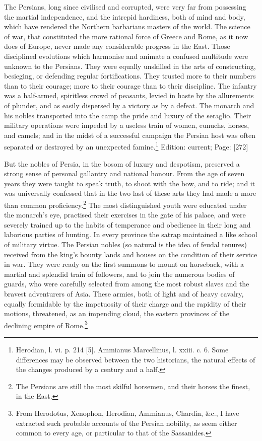 The Persians, long since civilised and corrupted, were very far from possessing the martial independence, and the intrepid hardiness, both of mind and body, which have rendered the Northern barbarians masters of the world. The science of war, that constituted the more rational force of Greece and Rome, as it now does of Europe, never made any considerable progress in the East. Those disciplined evolutions which harmonise and animate a confused multitude were unknown to the Persians. They were equally unskilled in the arts of constructing, besieging, or defending regular fortifications. They trusted more to their numbers than to their courage; more to their courage than to their discipline. The infantry was a half-armed, spiritless crowd of peasants, levied in haste by the allurements of plunder, and as easily dispersed by a victory as by a defeat. The monarch and his nobles transported into the camp the pride and luxury of the seraglio. Their military operations were impeded by a useless train of women, eunuchs, horses, and camels; and in the midst of a successful campaign the Persian host was often separated or destroyed by an unexpected famine.\footnote{Herodian, l. vi. p. 214 [5]. Ammianus Marcellinus, l. xxiii. c. 6. Some differences may be observed between the two historians, the natural effects of the changes produced by a century and a half.}
Edition: current; Page: [272]

But the nobles of Persia, in the bosom of luxury and despotism, preserved a strong sense of personal gallantry and national honour. From the age of seven years they were taught to speak truth, to shoot with the bow, and to ride; and it was universally confessed that in the two last of these arts they had made a more than common proficiency.\footnote{The Persians are still the most skilful horsemen, and their horses the finest, in the East.} The most distinguished youth were educated under the monarch\texthebrew{}’s eye, practised their exercises in the gate of his palace, and were severely trained up to the habits of temperance and obedience in their long and laborious parties of hunting. In every province the satrap maintained a like school of military virtue. The Persian nobles (so natural is the idea of feudal tenures) received from the king\texthebrew{}’s bounty lands and houses on the condition of their service in war. They were ready on the first summons to mount on horseback, with a martial and splendid train of followers, and to join the numerous bodies of guards, who were carefully selected from among the most robust slaves and the bravest adventurers of Asia. These armies, both of light and of heavy cavalry, equally formidable by the impetuosity of their charge and the rapidity of their motions, threatened, as an impending cloud, the eastern provinces of the declining empire of Rome.\footnote{From Herodotus, Xenophon, Herodian, Ammianus, Chardin, \&c., I have extracted such probable accounts of the Persian nobility, as seem either common to every age, or particular to that of the Sassanides.}

